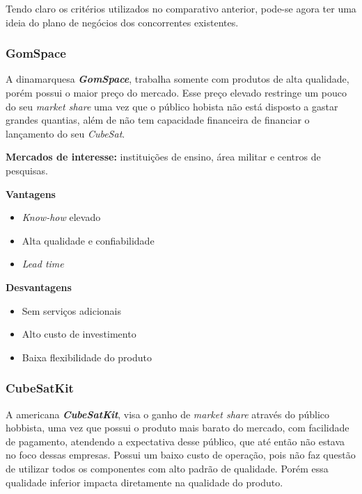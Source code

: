 \documentclass[
	12pt,				%
	openright,			%
	oneside,			%
	a4paper,			%
	english,			%
	french,				%
	spanish,			%
	brazil				%
	]{abntex2}
\begin{document}
	Tendo claro os critérios utilizados no comparativo anterior, pode-se agora ter uma ideia do plano de negócios dos concorrentes existentes.
	
	\subsubsection[GomSpace]{GomSpace}
	
	A dinamarquesa \textit{\textbf{GomSpace}}, trabalha somente com produtos de alta qualidade, porém possui o maior preço do mercado. Esse preço elevado restringe um pouco do seu \textit{market share} uma vez que o público hobista não está disposto a gastar grandes quantias, além de não tem capacidade financeira de financiar o lançamento do seu \textit{CubeSat}.
	
	\textbf{Mercados de interesse:} instituições de ensino, área militar e centros de pesquisas.
	
	\begin{minipage}{7cm}
	\begin{center}
	\textbf{Vantagens}
	\end{center}
	
	\begin{itemize}
	\item \textit{Know-how} elevado
	\item Alta qualidade e confiabilidade
	\item \textit{Lead time}
	\end{itemize}
	\end{minipage}
	\begin{minipage}{7cm}
	\begin{center}
	\textbf{Desvantagens}
	\end{center}
	
	\begin{itemize}
	\item Sem serviços adicionais
	\item Alto custo de investimento
	\item Baixa flexibilidade do produto
	\end{itemize}		
	\end{minipage}
	
	\subsubsection[CubeSatKit]{CubeSatKit}
	
	A americana \textit{\textbf{CubeSatKit}}, visa o ganho de \textit{market share} através do público hobbista, uma vez que possui o produto mais barato do mercado, com facilidade de pagamento, atendendo a expectativa desse público, que até então não estava no foco dessas empresas. Possui um baixo custo de operação, pois não faz questão de utilizar todos os componentes com alto padrão de qualidade. Porém essa qualidade inferior impacta diretamente na qualidade do produto.
	
\end{document}
